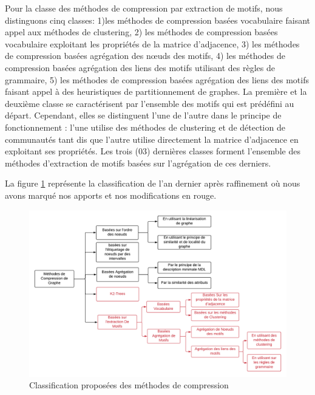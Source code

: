 Pour la classe des méthodes de compression par extraction de motifs, nous distinguons cinq classes: 1)les méthodes de compression basées vocabulaire faisant appel aux méthodes de clustering, 2) les méthodes de compression basées vocabulaire exploitant les propriétés de la matrice d'adjacence, 3) les méthodes de compression basées agrégation des nœuds des motifs, 4) les méthodes de compression basées agrégation des liens des motifs utilisant des règles de grammaire, 5) les méthodes de compression basées agrégation des liens des motifs faisant appel à des heuristiques de partitionnement de graphes. La première et la deuxième classe se caractérisent par l'ensemble des motifs qui est prédéfini au départ. Cependant, elles se distinguent l'une de l'autre dans le principe de fonctionnement : l'une utilise des méthodes de clustering et de détection de communautés tant dis que l'autre utilise directement la matrice d'adjacence en exploitant ses propriétés. Les trois (03) dernières classes forment l'ensemble des méthodes d'extraction de motifs basées sur l'agrégation de ces derniers. 



 La figure \ref{classif} représente la classification de l'an dernier après raffinement où nous avons marqué nos apports et nos modifications en rouge.

 \begin{figure}[H]
		\includegraphics[scale=0.55]{./ressources/image/classif.png}
		\caption{Classification proposées des méthodes de compression}
		\label{classif}
	\end{figure}





